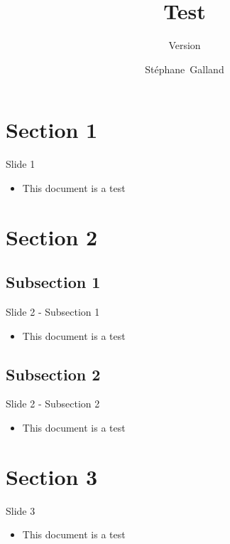 \documentclass{ciadbeamer}
\title{Test}
\subtitle{Version \insertciadbeamerthemeversion}
\author[S.~Galland]{St\'ephane~Galland}
\begin{document}
\tableofcontentsslide

\section{Section 1}

\begin{frame}{Slide 1}
	\begin{itemize}
	\item This document is a test
	\end{itemize}
\end{frame}

\section{Section 2}

\subsection{Subsection 1}

\begin{frame}{Slide 2 - Subsection 1}
	\begin{itemize}
	\item This document is a test
	\end{itemize}
\end{frame}

\subsection{Subsection 2}

\begin{frame}{Slide 2 - Subsection 2}
	\begin{itemize}
	\item This document is a test
	\end{itemize}
\end{frame}

\section{Section 3}

\begin{frame}{Slide 3}
	\begin{itemize}
	\item This document is a test
	\end{itemize}
\end{frame}
\end{document}

